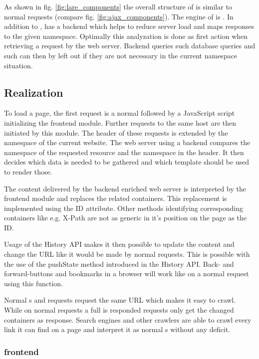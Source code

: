 As shown in fig. \ref{fig:lare_components} the overall structure of \lare{} is similar to normal \ajax{} requests (compare fig. \ref{fig:ajax_components}).
The \ajax{} engine of \lare{} is \lareJS{}.
In addition to \ajax{}, \lare{} has a backend which helps to reduce server load and maps responses to the given namespace.
Optimally this analyzation is done as first action when retrieving a request by the web server.
Backend queries such database queries and such can then by left out if they are not necessary in the current namespace situation.


\subsection{Realization}
To load a page, the first request is a normal \httpRequest{} followed by a JavaScript script initializing the \lare{} frontend module.
Further requests to the same host are then initiated by this module.
The \http{} header of these requests is extended by the namespace of the current website.
The web server using a \lare{} backend compares the namespace of the requested resource and the namespace in the \http{} header.
It then decides which data is needed to be gathered and which template should be used to render those.

The content delivered by the \lare{} backend enriched web server is interpreted by the frontend module and replaces the related containers.
This replacement is implemented using the ID attribute.
Other methods identifying corresponding containers like e.g. X-Path are not as generic in it's position on the page as the ID.

Usage of the History API makes it then possible to update the content and change the URL like it would be made by normal requests.
This is possible with the use of the pushState method introduced in the History API.
Back- and forward-buttons and bookmarks in a browser will work like on a normal request using this function.

Normal \httpRequest{}s and \lare{} requests request the same URL which makes it easy to crawl.
While on normal requests a full \webPage{} is responded \lare{} requests only get the changed containers as response.
Search engines and other crawlers are able to crawl every link it can find on a page and interpret it as normal \webPage{}s without any deficit.

\subsubsection{\lare{} frontend}

